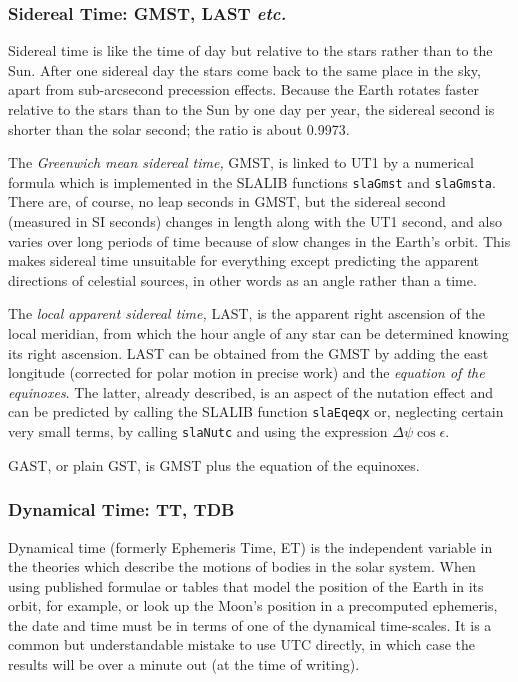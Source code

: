 \documentclass[11pt,fleqn,twoside]{article}
\renewcommand{\_}{{\tt\char'137}}     %
\begin{document}
\subsubsection{Sidereal Time: GMST, LAST {\it etc.}}
Sidereal time is like the time of day but relative to the
stars rather than to the Sun.  After
one sidereal day the stars come back to the same place in the
sky, apart from sub-arcsecond precession effects.  Because the Earth
rotates faster relative to the stars than to the Sun by one day
per year, the sidereal second is shorter than the solar
second; the ratio is about 0.9973.
 
The {\it Greenwich mean sidereal time,} GMST, is
linked to UT1 by a numerical formula which
is implemented in the SLALIB functions
{\tt slaGmst}
and
{\tt slaGmsta}.
There are, of course, no leap seconds in GMST, but the sidereal
second (measured in SI seconds)
changes in length along with the UT1 second, and also varies
over long periods of time because of slow changes in the Earth's
orbit.  This makes sidereal time unsuitable for everything except
predicting the apparent directions of celestial sources, in other
words as an angle rather than a time.
 
The {\it local apparent sidereal time,} LAST, is the apparent right
ascension of the local meridian, from which the hour angle of any
star can be determined knowing its right
ascension.  LAST can be obtained from the
GMST by adding the east longitude (corrected for polar motion
in precise work) and the {\it equation of the equinoxes}.  The
latter, already described, is an aspect of the nutation effect
and can be predicted by calling the SLALIB function
{\tt slaEqeqx}
or, neglecting certain very small terms, by calling
{\tt slaNutc}
and using the expression $\Delta\psi\cos\epsilon$.

GAST, or plain GST, is GMST plus the equation of the equinoxes.

\subsubsection{Dynamical Time: TT, TDB}
Dynamical time (formerly Ephemeris Time, ET)
is the independent variable in the theories
which describe the motions of bodies in the solar system.  When
using published formulae or
tables that model the position of the
Earth in its orbit, for example, or look up
the Moon's position in a precomputed ephemeris, the date and time
must be in terms of one of the dynamical time-scales.  It
is a common but understandable mistake to use UTC directly, in which
case the results will be over a minute out (at the time of writing).
 
\end{document}
